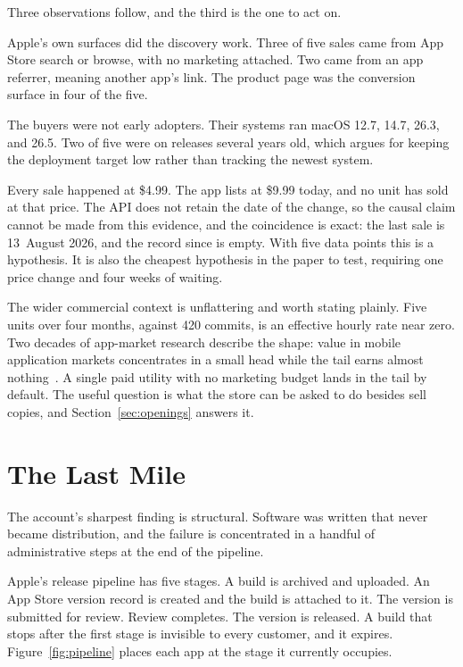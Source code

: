 \documentclass[10pt,letterpaper,twocolumn]{article}
\begin{document}
Three observations follow, and the third is the one to act on.

Apple's own surfaces did the discovery work. Three of five sales came
from App Store search or browse, with no marketing attached. Two came
from an app referrer, meaning another app's link. The product page was
the conversion surface in four of the five.

The buyers were not early adopters. Their systems ran macOS 12.7, 14.7,
26.3, and 26.5. Two of five were on releases several years old, which
argues for keeping the deployment target low rather than tracking the
newest system.

Every sale happened at \$4.99. The app lists at \$9.99 today, and no unit
has sold at that price. The API does not retain the date of the change,
so the causal claim cannot be made from this evidence, and the
coincidence is exact: the last sale is 13~August 2026, and the record
since is empty. With five data points this is a hypothesis. It is also
the cheapest hypothesis in the paper to test, requiring one price change
and four weeks of waiting.

The wider commercial context is unflattering and worth stating plainly.
Five units over four months, against 420 commits, is an effective hourly
rate near zero. Two decades of app-market research describe the shape:
value in mobile application markets concentrates in a small head while
the tail earns
almost nothing~\citep{bresnahan2014mobile,ghose2014demand,anderson2006longtail}.
A single paid utility with no marketing budget lands in the tail by
default. The useful question is what the store can be asked to do besides
sell copies, and Section~\ref{sec:openings} answers it.

\section{The Last Mile}
\label{sec:lastmile}

The account's sharpest finding is structural. Software was written that
never became distribution, and the failure is concentrated in a handful
of administrative steps at the end of the pipeline.

Apple's release pipeline has five stages. A build is archived and
uploaded. An App Store version record is created and the build is
attached to it. The version is submitted for review. Review completes.
The version is released. A build that stops after the first stage is
invisible to every customer, and it expires. Figure~\ref{fig:pipeline}
places each app at the stage it currently occupies.
\end{document}
